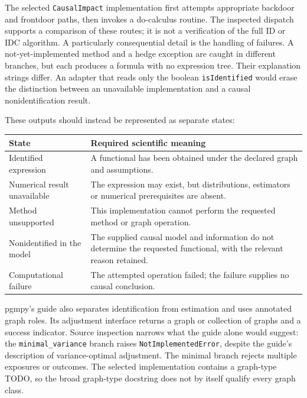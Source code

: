 The selected \texttt{CausalImpact} implementation first attempts appropriate
backdoor and frontdoor paths, then invokes a do-calculus routine. The inspected
dispatch supports a comparison of these routes; it is not a verification of
the full ID or IDC algorithm. A particularly consequential detail is the
handling of failures. A not-yet-implemented method and a hedge exception are
caught in different branches, but each produces a formula with no expression
tree. Their explanation strings differ. An adapter that reads only the boolean
\texttt{isIdentified} would erase the distinction between an unavailable
implementation and a causal nonidentification result.\cite{v12_sw_agrum}

These outputs should instead be represented as separate states:
\begin{center}
\begin{tabular}{p{}p{}}
\toprule
State & Required scientific meaning\\
\midrule
Identified expression & A functional has been obtained under the declared graph and assumptions.\\
Numerical result unavailable & The expression may exist, but distributions, estimators or numerical prerequisites are absent.\\
Method unsupported & This implementation cannot perform the requested method or graph operation.\\
Nonidentified in the model & The supplied causal model and information do not determine the requested functional, with the relevant reason retained.\\
Computational failure & The attempted operation failed; the failure supplies no causal conclusion.\\
\bottomrule
\end{tabular}
\end{center}

pgmpy's guide also separates identification from estimation and uses annotated
graph roles. Its adjustment interface returns a graph or collection of graphs
and a success indicator. Source inspection narrows what the guide alone would
suggest: the \texttt{minimal\_variance} branch raises
\texttt{NotImplementedError}, despite the guide's description of variance-optimal
adjustment. The minimal branch rejects multiple exposures or outcomes. The
selected implementation contains a graph-type TODO, so the broad graph-type
docstring does not by itself qualify every graph class.\cite{v12_sw_pgmpy}


